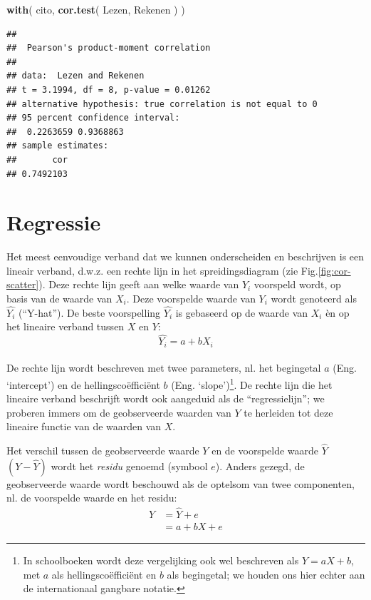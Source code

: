 \documentclass[
]{book}
\newenvironment{Shaded}{\begin{snugshade}}{\end{snugshade}}
\newcommand{\KeywordTok}[1]{\textcolor[rgb]{0.13,0.29,0.53}{\textbf{#1}}}
\newcommand{\NormalTok}[1]{#1}
\begin{document}
\begin{Shaded}
\begin{Highlighting}[]
\KeywordTok{with}\NormalTok{( cito, }\KeywordTok{cor.test}\NormalTok{( Lezen, Rekenen ) )}
\end{Highlighting}
\end{Shaded}

\begin{verbatim}
## 
##  Pearson's product-moment correlation
## 
## data:  Lezen and Rekenen
## t = 3.1994, df = 8, p-value = 0.01262
## alternative hypothesis: true correlation is not equal to 0
## 95 percent confidence interval:
##  0.2263659 0.9368863
## sample estimates:
##       cor 
## 0.7492103
\end{verbatim}

\hypertarget{sec:regressie}{%
\section{Regressie}\label{sec:regressie}}

Het meest eenvoudige verband dat we kunnen onderscheiden en beschrijven
is een lineair verband, d.w.z. een rechte lijn in het spreidingsdiagram
(zie Fig.\ref{fig:cor-scatter}). Deze rechte lijn geeft aan welke waarde
van \(Y_i\) voorspeld wordt, op basis van de waarde van \(X_i\). Deze
voorspelde waarde van \(Y_i\) wordt genoteerd als \(\widehat{Y_i}\)
(``Y-hat''). De beste voorspelling \(\widehat{Y_i}\) is gebaseerd op de
waarde van \(X_i\) èn op het lineaire verband tussen \(X\) en \(Y\):
\begin{equation}
    \widehat{Y_i} = a + b {X_i} 
  \label{eq:linearmodel2}
\end{equation}\\
De rechte lijn wordt beschreven met
twee parameters, nl. het begingetal \(a\) (Eng. `intercept') en de
hellingscoëfficiënt \(b\) (Eng. `slope')\footnote{In schoolboeken wordt deze vergelijking ook wel beschreven als \(Y = a X + b\), met \(a\) als hellingscoëfficiënt en \(b\) als begingetal; we houden ons hier echter aan de internationaal gangbare notatie.}. De rechte lijn die het
lineaire verband beschrijft wordt ook aangeduid als de ``regressielijn'';
we proberen immers om de geobserveerde waarden van \(Y\) te herleiden tot
deze lineaire functie van de waarden van \(X\).

Het verschil tussen de geobserveerde waarde \(Y\) en de voorspelde waarde
\(\widehat{Y}\) \((Y-\widehat{Y})\) wordt het \emph{residu} genoemd (symbool
\(e\)). Anders gezegd, de geobserveerde waarde wordt beschouwd als de
optelsom van twee componenten, nl. de voorspelde waarde en het residu:
\begin{align}
    Y   &= \widehat{Y} + e \\
        &= a + b X + e 
  \label{eq:linearmodel3}
\end{align}
\end{document}
